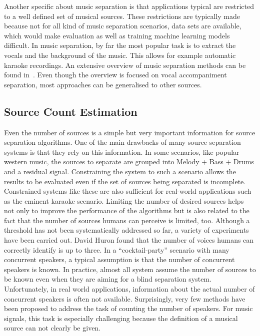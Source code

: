 Another specific about music separation is that applications typical are restricted to a well defined set of musical sources.
These restrictions are typically made because not for all kind of music separation scenarios, data sets are available, which would make evaluation as well as training machine learning models difficult.
In music separation, by far the most popular task is to extract the vocals and the background of the music.
This allows for example automatic karaoke recordings.
An extensive overview of music separation methods can be found in~\cite{rafii18}.
Even though the overview is focused on vocal accompaniment separation, most approaches can be generalised to other sources.

\subsection{Source Count Estimation}
Even the number of sources is a simple but very important information for source separation algorithms. One of the main drawbacks of many source separation systems is that they rely on this information. In some scenarios, like popular western music, the sources to separate are grouped into Melody + Bass + Drums and a residual signal. Constraining the system to such a scenario allows the results to be evaluated even if the set of sources being separated is incomplete. Constrained systems like these are also sufficient for real-world applications such as the eminent karaoke scenario. Limiting the number of desired sources helps not only to improve the performance of the algorithms but is also related to the fact that the number of sources humans can perceive is limited, too. Although a threshold has not been systematically addressed so far, a variety of experiments have been carried out. David Huron found \cite{huron89} that the number of voices humans can correctly identify is up to three.
In a “cocktail-party” scenario with many concurrent speakers, a typical assumption is that the number of concurrent speakers is known.
In practice, almost all system assume the number of sources to be known even when they are aiming for a blind separation system.
Unfortunately, in real world applications, information about the actual number of concurrent speakers
is often not available.
Surprisingly, very few methods have been proposed to address the task of
counting the number of speakers.
For music signals, this task is especially challenging because the definition of a musical source can not clearly be given.
